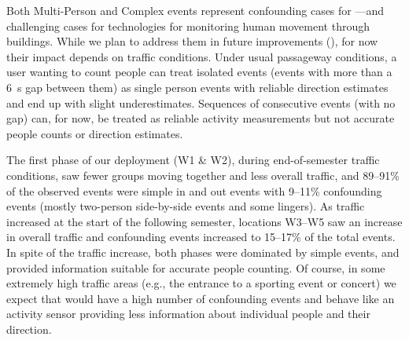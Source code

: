 Both Multi-Person and Complex events represent confounding cases for \sysname---and challenging cases for technologies for monitoring human movement through buildings.
While we plan to address them in future improvements (), for now their impact depends on traffic conditions.
Under usual passageway conditions, a user wanting to count people can treat isolated events (events with more than a \SI{6}{\second} gap between them) as single person events with reliable direction estimates and end up with slight underestimates.
Sequences of consecutive events (with no gap) can, for now, be treated as reliable activity measurements but not accurate people counts or direction estimates.


The first phase of our deployment (W1 \& W2), during end-of-semester traffic conditions, saw fewer groups moving together and less overall traffic, and 89--91\% of the observed events were simple in and out events with 9--11\% confounding events (mostly two-person side-by-side events and some lingers).
As traffic increased at the start of the following semester, locations W3--W5 saw an increase in overall traffic and confounding events increased to 15--17\% of the total events.
In spite of the traffic increase, both phases were dominated by simple events, and \sysname provided information suitable for accurate people counting.
Of course, in some extremely high traffic areas (e.g., the entrance to a sporting event or concert) we expect that \sysname would have a high number of confounding events and behave like an activity sensor providing less information about individual people and their direction.  


